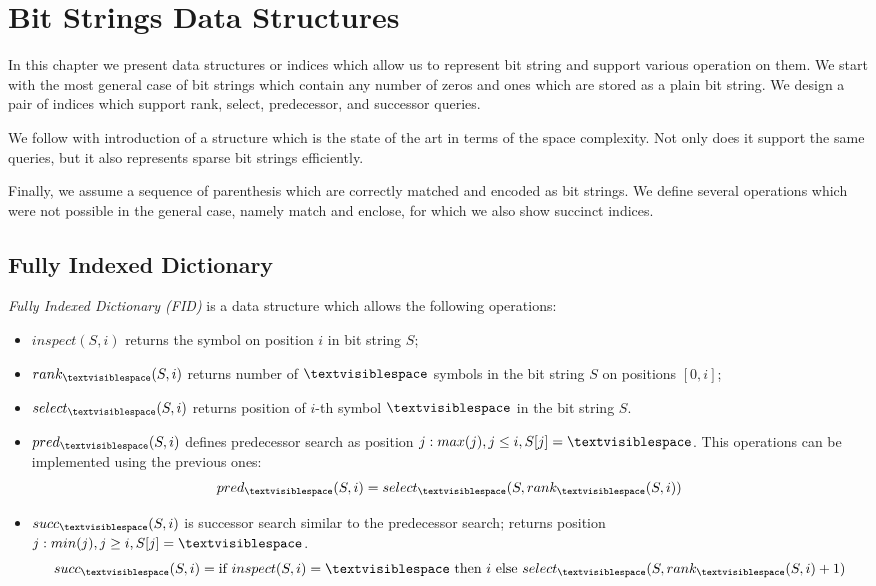 \chapter{Bit Strings Data Structures}

In this chapter we present data structures or indices which allow us to represent bit string and support various operation on them.
We start with the most general case of bit strings which contain any number of zeros and ones which are stored as a plain bit string.
We design a pair of indices which support rank, select, predecessor, and successor queries.

We follow with introduction of a structure which is the state of the art in terms of the space complexity.
Not only does it support the same queries, but it also represents sparse bit strings efficiently.

Finally, we assume a sequence of parenthesis which are correctly matched and encoded as bit strings.
We define several operations which were not possible in the general case, namely match and enclose, for which we also show succinct indices.

\section{Fully Indexed Dictionary}

\emph{Fully Indexed Dictionary (FID)} is a data structure which allows the following operations:
\begin{itemize}
	\item \emph{$inspect(S, i)$} returns the symbol on position $i$ in bit string $S$;
	\item \emph{$rank_{\ph}(S, i)$} returns number of $\ph$ symbols in the bit string $S$ on positions $[0, i]$;
	\item \emph{$select_{\ph}(S, i)$} returns position of $i$-th symbol $\ph$ in the bit string $S$.
	\item \emph{$pred_{\ph}(S, i)$} defines predecessor search as position $j : max(j), j \le i, S[j] = \ph$.
	This operations can be implemented using the previous ones:
	$$ pred_{\ph}(S, i) = select_{\ph}(S, rank_{\ph}(S, i)) $$
	\item \emph{$succ_{\ph}(S, i)$} is successor search similar to the predecessor search; returns position $j: min(j), j \ge i, S[j] = \ph$.
	$$ succ_{\ph}(S, i) = \textrm{if}\ inspect(S, i) = {\ph}\ \textrm{then}\ i \ \textrm{else}\ select_{\ph}(S, rank_{\ph}(S, i) + 1) $$
\end{itemize}

